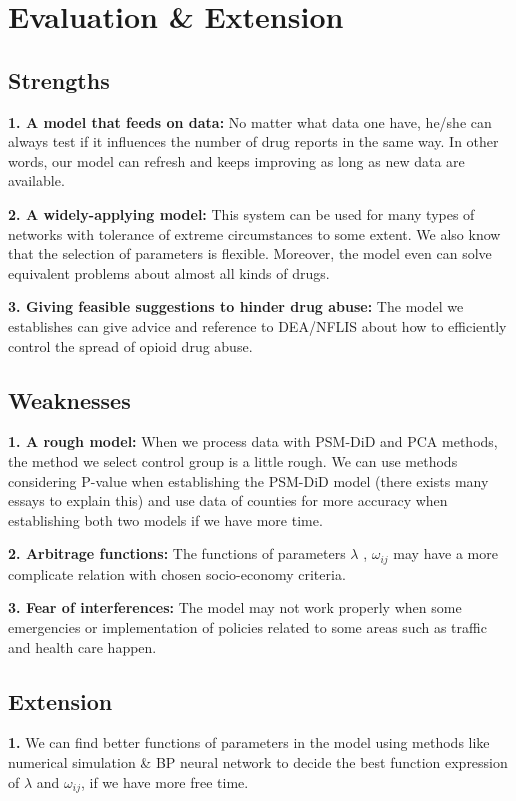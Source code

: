 \documentclass{mcmthesis}
\begin{document}
\section{Evaluation \& Extension}
\subsection{Strengths}
\noindent \textbf{1. A model that feeds on data:} No matter what data one have, he/she can always test if it influences the number of drug reports in the same way. In other words, our model can refresh and keeps improving as long as new data are available.

\noindent \textbf{2. A widely-applying model:} This system can be used for many types of networks with tolerance of extreme circumstances to some extent. We also know that the selection of parameters is flexible. Moreover, the model even can solve equivalent problems about almost all kinds of drugs.

\noindent \textbf{3. Giving feasible suggestions to hinder drug abuse:} The model we establishes can give advice and reference to DEA/NFLIS about how to efficiently control the spread of opioid drug abuse.
\subsection{Weaknesses}
\noindent \textbf{1. A rough model:} When we process data with PSM-DiD and PCA methods, the method we select control group is a little rough. We can use methods considering P-value when establishing the PSM-DiD model (there exists many essays to explain this) and use data of counties for more accuracy when establishing both two models if we have more time.

\noindent \textbf{2. Arbitrage functions:} The functions of parameters $\lambda$ , $\omega_{ij}$ may have a more complicate relation with chosen socio-economy criteria.

\noindent \textbf{3. Fear of interferences:} The model may not work properly when some emergencies or implementation of policies related to some areas such as traffic and health care happen.

\subsection{Extension}
\noindent \textbf{1.} We can find better functions of parameters in the model using methods like numerical simulation \& BP neural network to decide the best function expression of $\lambda$ and $\omega_{ij}$, if we have more free time.
\end{document}

